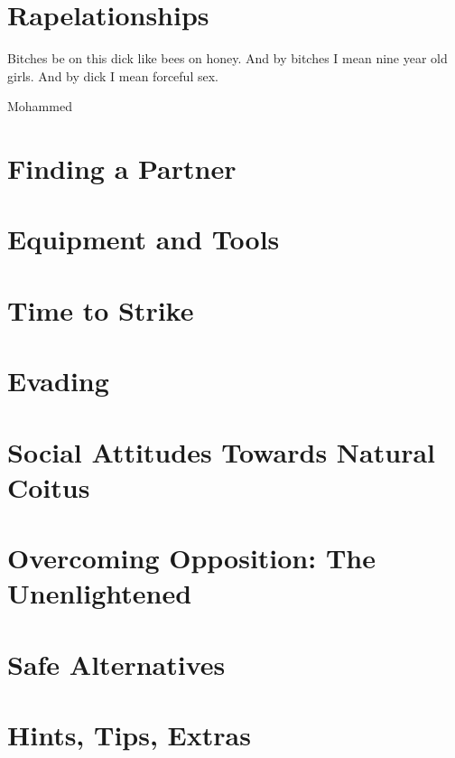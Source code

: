 

\chapter{Rapelationships}

\epigraph{Bitches be on this dick like bees on honey. And by bitches I mean 
nine 
year old girls. And by dick I mean forceful sex.}{Mohammed}



\chapter{Finding a Partner}



%


\chapter{Equipment and Tools}



\chapter{Time to Strike}


\chapter{Evading}


\chapter{Social Attitudes Towards Natural Coitus}


\chapter{Overcoming Opposition: The Unenlightened}



\chapter{Safe Alternatives}



\chapter{Hints, Tips, Extras}
